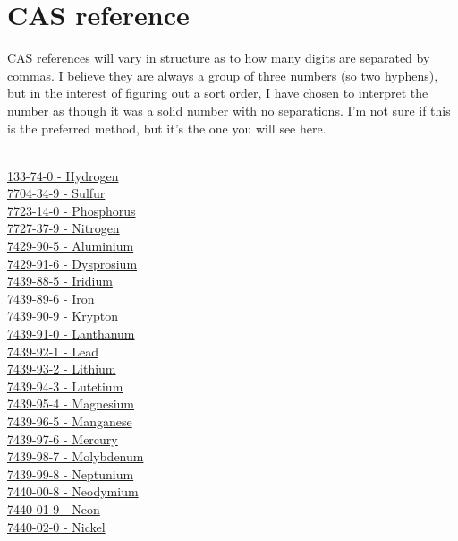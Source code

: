 \documentclass{book}
\begin{document}
\chapter{CAS reference}
CAS references will vary in structure as to how many digits are separated by commas.  I believe they are always a group of three numbers (so two hyphens), but in the interest of figuring out a sort order, I have chosen to interpret the number as though it was a solid number with no separations.  I'm not sure if this is the preferred method, but it's the one you will see here.\\
\\
\begin{multicols}{2}
\noindent
\hyperref[sec:elem-hydrogen]{133-74-0 - Hydrogen}\\
\hyperref[sec:elem-sulfur]{7704-34-9 - Sulfur}\\
\hyperref[sec:elem-phosphorus]{7723-14-0 - Phosphorus}\\
\hyperref[sec:elem-nitrogen]{7727-37-9 - Nitrogen}\\
\hyperref[sec:elem-aluminium]{7429-90-5 - Aluminium}\\
\hyperref[sec:elem-dysprosium]{7429-91-6 - Dysprosium}\\
\hyperref[sec:elem-iridium]{7439-88-5 - Iridium}\\
\hyperref[sec:elem-iron]{7439-89-6 - Iron}\\
\hyperref[sec:elem-krypton]{7439-90-9 - Krypton}\\
\hyperref[sec:elem-lanthanum]{7439-91-0 - Lanthanum}\\
\hyperref[sec:elem-lead]{7439-92-1 - Lead}\\
\hyperref[sec:elem-lithium]{7439-93-2 - Lithium}\\
\hyperref[sec:elem-lutetium]{7439-94-3 - Lutetium}\\
\hyperref[sec:elem-magnesium]{7439-95-4 - Magnesium}\\
\hyperref[sec:elem-manganese]{7439-96-5 - Manganese}\\
\hyperref[sec:elem-mercury]{7439-97-6 - Mercury}\\
\hyperref[sec:elem-molybdenum]{7439-98-7 - Molybdenum}\\
\hyperref[sec:elem-neptunium]{7439-99-8 - Neptunium}\\
\hyperref[sec:elem-neodymium]{7440-00-8 - Neodymium}\\
\hyperref[sec:elem-neon]{7440-01-9 - Neon}\\
\hyperref[sec:elem-nickel]{7440-02-0 - Nickel}\\

\end{multicols}
\end{document}
